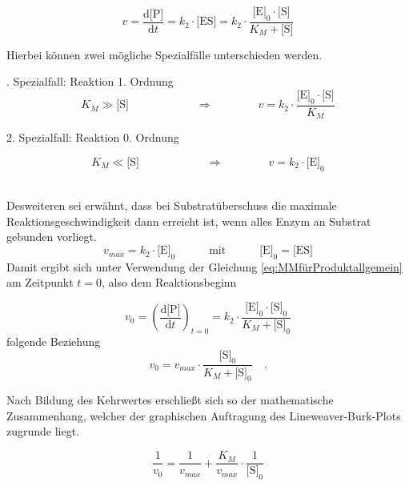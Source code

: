 \begin{equation}
v=\frac{\text{d[P]}}{\text{d}t}=k_2\cdot\text{[ES]} =k_2\cdot \frac{\text{[E]}_0\cdot\text{[S]}}{K_M+\text{[S]}}
\label{eq:MMfürProduktallgemein}
\end{equation}


Hierbei können zwei mögliche Spezialfälle unterschieden werden.
\\
\par
\begingroup
\leftskip=1cm %
. Spezialfall: Reaktion 1. Ordnung
\begin{equation}
K_M \gg \text{[S]}\quad\quad\quad\quad\quad\quad \Longrightarrow \quad\quad\quad\quad v=k_2\cdot \frac{\text{[E]}_0\cdot\text{[S]}}{K_M}
\end{equation}

2. Spezialfall: Reaktion 0. Ordnung

\begin{equation}
K_M \ll \text{[S]}\quad\quad\quad\quad\quad\quad \Longrightarrow \quad\quad\quad\quad v=k_2\cdot \text{[E]}_0
\end{equation}
\\
\par
\endgroup
Desweiteren sei erwähnt, dass bei Substratüberschuss die maximale Reaktionsgeschwindigkeit dann erreicht ist, wenn alles Enzym an Substrat gebunden vorliegt.
\begin{equation}
v_{max}=k_2\cdot\text{[E]}_0\quad\quad\quad \text{mit}\quad\quad\quad\text{[E]}_0=\text{[ES]}
\label{eq:vmaxmitk2}
\end{equation}
Damit ergibt sich unter Verwendung der Gleichung \ref{eq:MMfürProduktallgemein} 
am Zeitpunkt $t=0$, also dem Reaktionsbeginn 

\begin{equation}
v_0=\left(\frac{\text{d[P]}}{\text{d}t}\right)_{t=0}=k_2\cdot \frac{\text{[E]}_0\cdot\text{[S]}_0}{K_M+\text{[S]}_0}
\label{eq:MMfürProduktbeinull}
\end{equation}
 folgende Beziehung
\begin{equation}
v_0=v_{max}\cdot \frac{\text{[S]}_0}{K_M+\text{[S]}_0}\quad\text{.}
\end{equation}

Nach Bildung des Kehrwertes erschließt sich so der mathematische Zusammenhang, welcher der graphischen Auftragung des Lineweaver-Burk-Plots zugrunde liegt.

\begin{equation}
\frac{1}{v_{0}}=\frac{1}{v_{max}}+\frac{K_M}{v_{max}}\cdot \frac{1}{\text{[S]}_0}
\label{eq:lineweaverPlot}
\end{equation}
